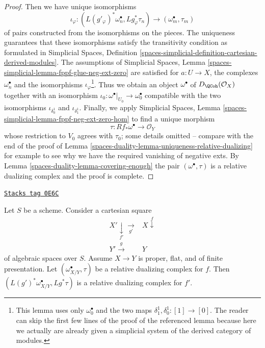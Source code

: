 \begin{proof}
Then we have unique isomorphisms
$$
\iota_\varphi :
(L(g'_\varphi)^*\omega_n^\bullet, Lg_\varphi^*\tau_n)
\longrightarrow
(\omega_m^\bullet, \tau_m)
$$
of pairs constructed from the isomorphisms on the pieces.
The uniqueness guarantees that these isomorphisms satisfy
the transitivity condition as formulated in
Simplicial Spaces, Definition
\ref{spaces-simplicial-definition-cartesian-derived-modules}.
The assumptions of Simplicial Spaces, Lemma
\ref{spaces-simplicial-lemma-fppf-glue-neg-ext-zero}
are satisfied for $a : U \to X$, the complexes $\omega_n^\bullet$
and the isomorphisms $\iota_\varphi$\footnote{This lemma uses only
$\omega_0^\bullet$ and the two maps $\delta_1^1, \delta_0^1 : [1] \to [0]$.
The reader can skip the first few lines of the proof of the
referenced lemma
because here we actually are already given a simplicial system of
the derived category of modules.}.
Thus we obtain an object $\omega^\bullet$ of $D_\QCoh(\mathcal{O}_X)$
together with an isomorphism
$\iota_0 : \omega^\bullet|_{U_0} \to \omega_0^\bullet$
compatible with the two isomorphisms
$\iota_{\delta^1_0}$ and $\iota_{\delta^1_1}$.
Finally, we apply
Simplicial Spaces, Lemma
\ref{spaces-simplicial-lemma-fppf-neg-ext-zero-hom}
to find a unique morphism
$$
\tau : Rf_*\omega^\bullet \longrightarrow \mathcal{O}_Y
$$
whose restriction to $V_0$ agrees with $\tau_0$; some details omitted --
compare with the end of the  proof of
Lemma \ref{spaces-duality-lemma-uniqueness-relative-dualizing}
for example to see why we have
the required vanishing of negative exts.
By Lemma \ref{spaces-duality-lemma-covering-enough}
the pair $(\omega^\bullet, \tau)$ is a relative dualizing complex
and the proof is complete.
\end{proof}

\begin{lemma}
\label{spaces-duality-lemma-base-change-relative-dualizing}
\href{https://stacks.math.columbia.edu/tag/0E6C}{\texttt{Stacks tag 0E6C}}

Let $S$ be a scheme. Consider a cartesian square
$$
\begin{array}{cc}X' \underset{f'}{\downarrow}\underset{g'}{\longrightarrow} & X \overset{f}{\downarrow} \\ Y' \overset{g}{\longrightarrow} & Y\end{array}
$$
of algebraic spaces over $S$. Assume $X \to Y$ is proper, flat, and
of finite presentation. Let $(\omega_{X/Y}^\bullet, \tau)$ be a
relative dualizing complex for $f$. Then
$(L(g')^*\omega_{X/Y}^\bullet, Lg^*\tau)$ is a relative dualizing
complex for $f'$.
\end{lemma}

